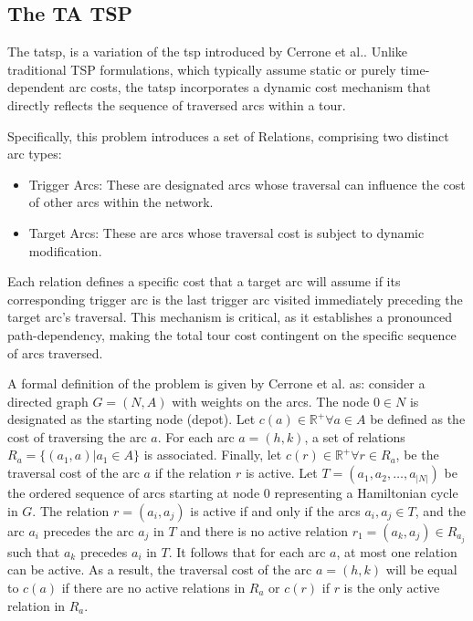\documentclass[twocolumn, switch]{article} %
\begin{document}
\subsection{The TA TSP}

The \gls{tatsp}, is a variation of the \gls{tsp} introduced by Cerrone et al.\cite{Cerrone}. 
Unlike traditional TSP formulations, which typically assume static or purely time-dependent arc costs, 
the \gls{tatsp} incorporates a dynamic cost mechanism that directly reflects the sequence of traversed arcs within a tour.

Specifically, this problem introduces a set of Relations, comprising two distinct arc types:
\begin{itemize}
\item Trigger Arcs: These are designated arcs whose traversal can influence the cost of other arcs within the network.
\item Target Arcs: These are arcs whose traversal cost is subject to dynamic modification.
\end{itemize}
Each relation defines a specific cost that a target arc will assume if its corresponding trigger arc is the last trigger 
arc visited immediately preceding the target arc's traversal. This mechanism is critical, as it establishes a pronounced 
path-dependency, making the total tour cost contingent on the specific sequence of arcs traversed.

A formal definition of the problem is given by Cerrone et al. \cite{Cerrone} as:
consider a directed graph $G = (N,A)$ with weights on the arcs. 
The node $0 \in N$ is designated as the starting node (depot). Let $c(a) \in \mathbb{R}^+ \forall a \in A$ 
be defined as the cost of traversing the arc $a$. For each arc $a=(h, k)$, a set of relations $R_a = \{(a_1, a)| a_1 \in A\}$ 
is associated. Finally, let $c(r) \in \mathbb{R}^+ \forall r \in R_a$, be the traversal cost of the arc $a$ if the relation $r$ 
is active. Let $T = (a_1, a_2, \ldots, a_{|N|})$ be the ordered sequence of arcs starting at node $0$ representing a Hamiltonian 
cycle in $G$. The relation $r = (a_i, a_j)$ is active if and only if the arcs $a_i, a_j \in T$, and the arc $a_i$ precedes the arc 
$a_j$ in $T$ and there is no active relation $r_1 = (a_k, a_j) \in R_{a_j}$ such that $a_k$ precedes $a_i$ in $T$. It follows that 
for each arc $a$, at most one relation can be active. As a result, the traversal cost of the arc $a = (h, k)$ will be equal to $c(a)$ 
if there are no active relations in $R_a$ or $c(r)$ if $r$ is the only active relation in $R_a$.
\end{document}
